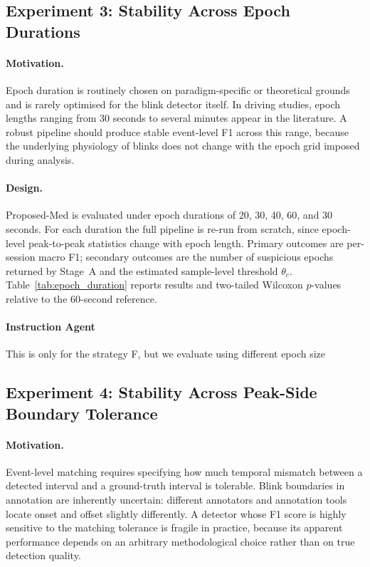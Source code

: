 \subsection{Experiment 3: Stability Across Epoch Durations}
\label{sec:exp5}

\paragraph{Motivation.}
Epoch duration is routinely chosen on paradigm-specific or theoretical grounds
and is rarely optimised for the blink detector itself.
In driving studies, epoch lengths ranging from 30 seconds to several minutes
appear in the literature.
A robust pipeline should produce stable event-level F1 across this range,
because the underlying physiology of blinks does not change with the epoch
grid imposed during analysis.

\paragraph{Design.}
Proposed-Med is evaluated under epoch durations of 20, 30, 40, 60, and 30 seconds.
For each duration the full pipeline is re-run from scratch, since epoch-level
peak-to-peak statistics change with epoch length.
Primary outcomes are per-session macro F1; secondary outcomes are the number of
suspicious epochs returned by Stage~A and the estimated sample-level threshold
$\theta_c$.
Table~\ref{tab:epoch_duration} reports results and two-tailed Wilcoxon $p$-values
relative to the 60-second reference.

\paragraph{Instruction Agent}
This is only for the strategy F, but we evaluate using different epoch size





\subsection{Experiment 4: Stability Across Peak-Side Boundary Tolerance}
\label{sec:exp7}

\paragraph{Motivation.}
Event-level matching requires specifying how much temporal mismatch between a
detected interval and a ground-truth interval is tolerable.
Blink boundaries in annotation are inherently uncertain: different annotators and
annotation tools locate onset and offset slightly differently.
A detector whose F1 score is highly sensitive to the matching tolerance is
fragile in practice, because its apparent performance depends on an arbitrary
methodological choice rather than on true detection quality.

